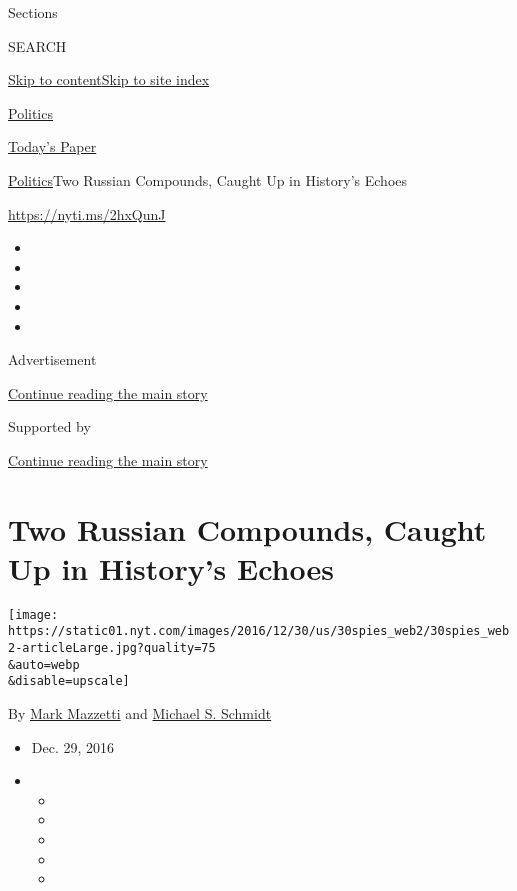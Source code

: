 Sections

SEARCH

\protect\hyperlink{site-content}{Skip to
content}\protect\hyperlink{site-index}{Skip to site index}

\href{https://www.nytimes.com/section/politics}{Politics}

\href{https://myaccount.nytimes.com/auth/login?response_type=cookie\&client_id=vi}{}

\href{https://www.nytimes.com/section/todayspaper}{Today's Paper}

\href{/section/politics}{Politics}\textbar{}Two Russian Compounds,
Caught Up in History's Echoes

\url{https://nyti.ms/2hxQunJ}

\begin{itemize}
\item
\item
\item
\item
\item
\end{itemize}

Advertisement

\protect\hyperlink{after-top}{Continue reading the main story}

Supported by

\protect\hyperlink{after-sponsor}{Continue reading the main story}

\hypertarget{two-russian-compounds-caught-up-in-historys-echoes}{%
\section{Two Russian Compounds, Caught Up in History's
Echoes}\label{two-russian-compounds-caught-up-in-historys-echoes}}

\texttt{[image: https://static01.nyt.com/images/2016/12/30/us/30spies\_web2/30spies\_web2-articleLarge.jpg?quality=75\\\&auto=webp\\\&disable=upscale]}

By \href{http://www.nytimes.com/by/mark-mazzetti}{Mark Mazzetti} and
\href{http://www.nytimes.com/by/michael-s-schmidt}{Michael S. Schmidt}

\begin{itemize}
\item
  Dec. 29, 2016
\item
  \begin{itemize}
  \item
  \item
  \item
  \item
  \item
  \end{itemize}
\end{itemize}

